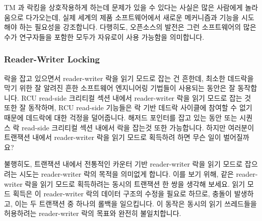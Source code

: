 TM 과 락킹을 상호작용하게 하는데 문제가 있을 수 있다는 사실은 많은 사람에게
놀라움으로 다가오는데, 실제 세계의 제품 소프트웨어에서 새로운 메커니즘과 기능을
시도해야 하는 필요성을 강조합니다.
다행히도, 오픈소스의 발전은 그런 소프트웨어의 많은 수가 연구자들을 포함한
모두가 자유로이 사용 가능함을 의미합니다.

\subsubsection{Reader-Writer Locking}
\label{sec:future:Reader-Writer Locking}

락을 잡고 있으면서 reader-writer 락을 읽기 모드로 잡는 건 흔한데, 최소한
데드락을 막기 위한 잘 알려진 흔한 소프트웨어 엔지니어링 기법들이 사용되는
동안은 잘 동작합니다.
RCU read-side 크리티컬 섹션 내에서 reader-writer 락을 읽기 모드로 잡는 것 또한
잘 동작하며, RCU read-side 기능들은 락 기반 데드락 사이클에 참여할 수 없기
때문에 데드락에 대한 걱정을 덜어줍니다.
해저드 포인터를 잡고 있는 동안 또는 시퀀스 락 read-side 크리티컬 섹션 내에서
락을 잡는것 또한 가능합니다.
하지만 여러분이 트랜잭션 내에서 reader-writer 락을 읽기 모드로 획득하려 하면
무슨 일이 벌어질까요?

불행히도, 트랜잭션 내에서 전통적인 카운터 기반 reader-writer 락을 읽기 모드로
잡으려는 시도는 reader-writer 락의 목적을 의미없게 합니다.
이를 보기 위해, 같은 reader-writer 락을 읽기 모드로 획득하려는 동시의 트랜잭션
한 쌍을 생각해 보세요.
읽기 모드 획득은 이 reader-writer 락의 데이터 구조의 수정을 필요로 하므로,
충돌이 발생하고, 이는 두 트랜잭션 중 하나의 롤백을 일으킵니다.
이 동작은 동시의 읽기 쓰레드들을 허용하려는 reader-writer 락의 목표와 완전히
불일치합니다.

